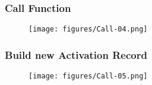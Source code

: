 \documentclass[usepdftitle=false,professionalfonts,compress ]{beamer}
\begin{document}
{
\begin{frame}\frametitle{Call Function}
\begin{figure}
	\texttt{[image: figures/Call-04.png]}\end{figure}
\end{frame}}



{
\begin{frame}\frametitle{Build new Activation Record}
\begin{figure}
	\texttt{[image: figures/Call-05.png]}\end{figure}
\end{frame}}
\end{document}
